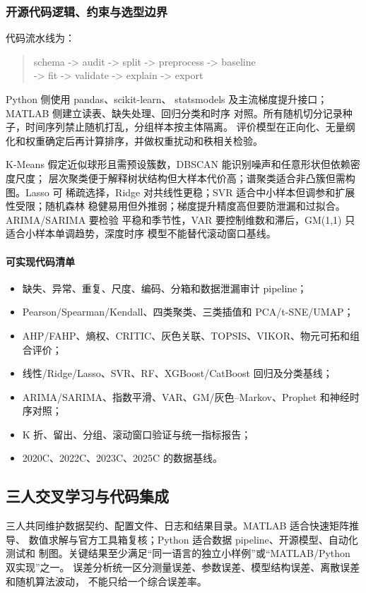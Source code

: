 \documentclass[UTF8,a4paper,12pt]{ctexart}
\begin{document}
\subsubsection{开源代码逻辑、约束与选型边界}

代码流水线为：
\begin{quote}
\small\ttfamily
schema -> audit -> split -> preprocess -> baseline\\
-> fit -> validate -> explain -> export
\end{quote}
Python 侧使用 pandas、scikit-learn、
statsmodels 及主流梯度提升接口；MATLAB 侧建立读表、缺失处理、回归分类和时序
对照。所有随机切分记录种子，时间序列禁止随机打乱，分组样本按主体隔离。
评价模型在正向化、无量纲化和权重确定后再计算排序，并做权重扰动和秩相关检验。

K-Means 假定近似球形且需预设簇数，DBSCAN 能识别噪声和任意形状但依赖密度尺度；
层次聚类便于解释树状结构但大样本代价高；谱聚类适合非凸簇但需构图。Lasso 可
稀疏选择，Ridge 对共线性更稳；SVR 适合中小样本但调参和扩展性受限；随机森林
稳健易用但外推弱；梯度提升精度高但要防泄漏和过拟合。ARIMA/SARIMA 要检验
平稳和季节性，VAR 要控制维数和滞后，GM(1,1) 只适合小样本单调趋势，深度时序
模型不能替代滚动窗口基线。

\paragraph{可实现代码清单}
\begin{itemize}
  \item 缺失、异常、重复、尺度、编码、分箱和数据泄漏审计 pipeline；
  \item Pearson/Spearman/Kendall、四类聚类、三类插值和 PCA/t-SNE/UMAP；
  \item AHP/FAHP、熵权、CRITIC、灰色关联、TOPSIS、VIKOR、物元可拓和组合评价；
  \item 线性/Ridge/Lasso、SVR、RF、XGBoost/CatBoost 回归及分类基线；
  \item ARIMA/SARIMA、指数平滑、VAR、GM/灰色--Markov、Prophet 和神经时序对照；
  \item K 折、留出、分组、滚动窗口验证与统一指标报告；
  \item 2020C、2022C、2023C、2025C 的数据基线。
\end{itemize}

\subsection{三人交叉学习与代码集成}

三人共同维护数据契约、配置文件、日志和结果目录。MATLAB 适合快速矩阵推导、
数值求解与官方工具箱复核；Python 适合数据 pipeline、开源模型、自动化测试和
制图。关键结果至少满足“同一语言的独立小样例”或“MATLAB/Python 双实现”之一。
误差分析统一区分测量误差、参数误差、模型结构误差、离散误差和随机算法波动，
不能只给一个综合误差率。
\end{document}
